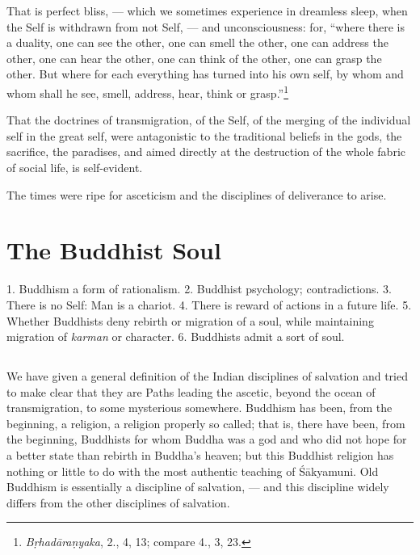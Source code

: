 \documentclass[a4paper, 11pt, oneside, english, landscape]{article}
\begin{document}
That is perfect bliss, --- which we sometimes experience in dreamless sleep, when the Self is withdrawn from not Self, --- and unconsciousness: for, ``where there is a duality, one can see the other, one can smell the other, one can address the other, one can hear the other, one can think of the other, one can grasp the other. But where for each everything has turned into his own self, by whom and whom shall he see, smell, address, hear, think or grasp.''\footnote{\emph{Bṛhadāraṇyaka}, 2., 4, 13; compare 4., 3, 23.}

That the doctrines of transmigration, of the Self, of the merging of the individual self in the great self, were antagonistic to the traditional beliefs in the gods, the sacrifice, the paradises, and aimed directly at the destruction of the whole fabric of social life, is self-evident.

The times were ripe for asceticism and the disciplines of deliverance to arise.
\clearpage
\section{The Buddhist Soul}
\begin{center}\footnotesize
1. Buddhism a form of rationalism. 2. Buddhist psychology; contradictions. 3. There is no Self: Man is a chariot. 4. There is reward of actions in a future life. 5. Whether Buddhists deny rebirth or migration of a soul, while maintaining migration of \emph{karman} or character. 6. Buddhists admit a sort of soul.
\end{center}
\subsection{}
\paragraph{}
We have given a general definition of the Indian disciplines of salvation and tried to make clear that they are Paths leading the ascetic, beyond the ocean of transmigration, to some mysterious somewhere. Buddhism has been, from the beginning, a religion, a religion properly so called; that is, there have been, from the beginning, Buddhists for whom Buddha was a god and who did not hope for a better state than rebirth in Buddha's heaven; but this Buddhist religion has nothing or little to do with the most authentic teaching of Śākyamuni. Old Buddhism is essentially a discipline of salvation, --- and this discipline widely differs from the other disciplines of salvation.
\end{document}
